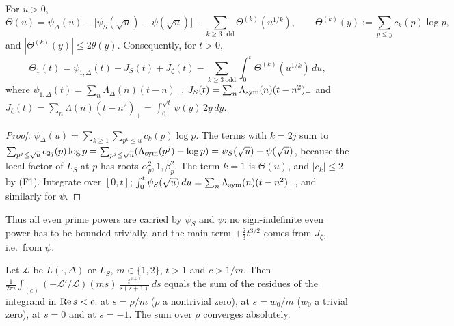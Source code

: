 \begin{lemma}\label{lem:decomp}
For $u>0$,
\[
\Theta(u)=\psi_\Delta(u)-\bigl[\psi_S(\sqrt u)-\psi(\sqrt u)\bigr]-\sum_{k\ge3\ \mathrm{odd}}\Theta^{(k)}(u^{1/k}),\qquad \Theta^{(k)}(y):=\sum_{p\le y}c_k(p)\log p,
\]
and $|\Theta^{(k)}(y)|\le2\theta(y)$. Consequently, for $t>0$,
\begin{equation}\label{eq:decomp}
\Theta_1(t)=\psi_{1,\Delta}(t)-J_S(t)+J_\zeta(t)-\sum_{k\ge3\ \mathrm{odd}}\int_0^t\Theta^{(k)}(u^{1/k})\,du,
\end{equation}
where $\psi_{1,\Delta}(t)=\sum_n\Lambda_\Delta(n)(t-n)_+$, $J_S(t)=\sum_n\Lambda_{\rm sym}(n)(t-n^2)_+$ and $J_\zeta(t)=\sum_n\Lambda(n)(t-n^2)_+=\int_0^{\sqrt t}\psi(y)\,2y\,dy$.
\end{lemma}

\begin{proof}
$\psi_\Delta(u)=\sum_{k\ge1}\sum_{p^k\le u}c_k(p)\log p$. The terms with $k=2j$ sum to $\sum_{p^j\le\sqrt u}c_{2j}(p)\log p=\sum_{p^j\le\sqrt u}(\Lambda_{\rm sym}(p^j)-\log p)=\psi_S(\sqrt u)-\psi(\sqrt u)$, because the local factor of $L_S$ at $p$ has roots $\alpha_p^2,1,\beta_p^2$. The term $k=1$ is $\Theta(u)$, and $|c_k|\le2$ by (F1). Integrate over $[0,t]$; $\int_0^t\psi_S(\sqrt u)\,du=\sum_n\Lambda_{\rm sym}(n)(t-n^2)_+$, and similarly for $\psi$.
\end{proof}

Thus all even prime powers are carried by $\psi_S$ and $\psi$: no sign-indefinite even power has to be bounded trivially, and the main term $+\frac23t^{3/2}$ comes from $J_\zeta$, i.e.\ from $\psi$.

\begin{lemma}\label{lem:contour}
Let $\mathcal L$ be $L(\cdot,\Delta)$ or $L_S$, $m\in\{1,2\}$, $t>1$ and $c>1/m$. Then $\frac1{2\pi i}\int_{(c)}(-\mathcal L'/\mathcal L)(ms)\,\frac{t^{s+1}}{s(s+1)}\,ds$ equals the sum of the residues of the integrand in $\operatorname{Re} s<c$: at $s=\rho/m$ ($\rho$ a nontrivial zero), at $s=w_0/m$ ($w_0$ a trivial zero), at $s=0$ and at $s=-1$. The sum over $\rho$ converges absolutely.
\end{lemma}

